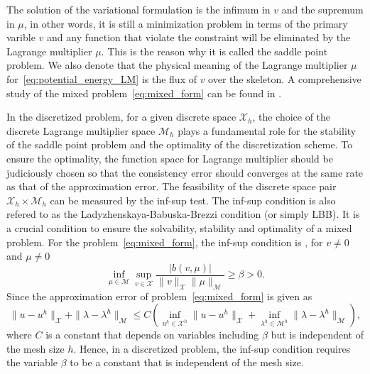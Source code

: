 \documentclass[preprint,12pt]{elsarticle}
\theoremstyle{remark}
\begin{document}
The solution of the variational formulation is the infimum in $v$ and the supremum in $\mu$, in other words, it is still a minimization problem in terms of the primary varible $v$ and any function that violate the constraint will be eliminated by the Lagrange multiplier $\mu$. This is the reason why it is called the saddle point problem. We also denote that the physical meaning of the Lagrange multiplier $\mu$ for~\eqref{eq:potential_energy_LM} is the flux of $v$ over the skeleton. A comprehensive study of the mixed problem~\eqref{eq:mixed_form} can be found in \cite{boffi_mixed_2013}.\par

In the discretized problem, for a given discrete space $\mathcal{X}_h$, the choice of the discrete Lagrange multiplier space $\mathcal{M}_h$ plays a fundamental role for the stability of the saddle point problem and the optimality of the discretization scheme. To ensure the optimality, the function space for Lagrange multiplier should be judiciously chosen so that the consistency error should converges at the same rate as that of the approximation error. The feasibility of the discrete space pair $\mathcal{X}_h\times{}\mathcal{M}_h$ can be measured by the inf-sup test. The inf-sup condition is also refered to as the Ladyzhenskaya-Babuska-Brezzi condition (or simply LBB). It is a crucial condition to ensure the solvability, stability and optimality of a mixed problem. For the problem~\eqref{eq:mixed_form}, the inf-sup condition is \cite{boffi_mixed_2013}, for $v\neq{0}$ and $\mu\neq{0}$
\begin{equation}
    \inf_{\mu\in{\mathcal{M}}}\sup_{v\in{\mathcal{X}}}\dfrac{\vert{b\left({v,\mu}\right)}\vert}{\|{v}\|_{\mathcal{X}}\|{\mu}\|_{\mathcal{M}}}\geq\beta>0.
\end{equation}
Since the approximation error of problem~\eqref{eq:mixed_form} is given as
\begin{equation}
    \|u-u^h\|_{\mathcal{X}}+\|\lambda-\lambda^h\|_{\mathcal{M}}\leq{}C\left({\inf_{u^h\in\mathcal{X}^h}\|u-u^h\|_{\mathcal{X}}+\inf_{\lambda^h\in\mathcal{M}^h}\|\lambda-\lambda^h\|_{\mathcal{M}}}\right),
\end{equation}
where $C$ is a constant that depends on variables including $\beta$ but is independent of the mesh size $h$. Hence, in a discretized problem, the inf-sup condition requires the variable $\beta$ to be a constant that is independent of the mesh size. \par 
\end{document}

